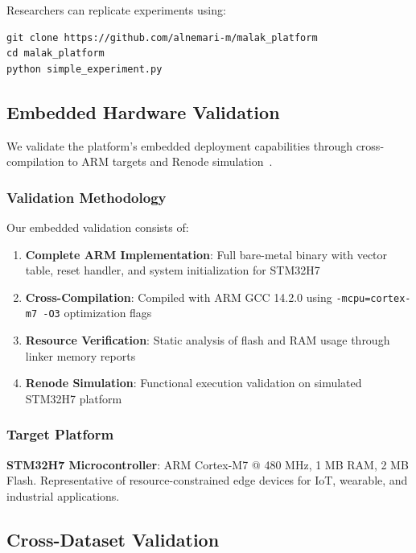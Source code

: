 Researchers can replicate experiments using:
\begin{verbatim}
git clone https://github.com/alnemari-m/malak_platform
cd malak_platform
python simple_experiment.py
\end{verbatim}

\subsection{Embedded Hardware Validation}

We validate the platform's embedded deployment capabilities through cross-compilation to ARM targets and Renode simulation~\cite{renode}.

\subsubsection{Validation Methodology}

Our embedded validation consists of:

\begin{enumerate}
\item \textbf{Complete ARM Implementation}: Full bare-metal binary with vector table, reset handler, and system initialization for STM32H7

\item \textbf{Cross-Compilation}: Compiled with ARM GCC 14.2.0 using \texttt{-mcpu=cortex-m7 -O3} optimization flags

\item \textbf{Resource Verification}: Static analysis of flash and RAM usage through linker memory reports

\item \textbf{Renode Simulation}: Functional execution validation on simulated STM32H7 platform
\end{enumerate}

\subsubsection{Target Platform}

\textbf{STM32H7 Microcontroller}: ARM Cortex-M7 @ 480 MHz, 1 MB RAM, 2 MB Flash. Representative of resource-constrained edge devices for IoT, wearable, and industrial applications.

\subsection{Cross-Dataset Validation}

